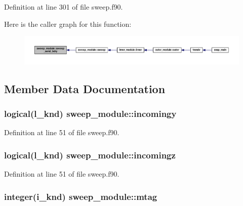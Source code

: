 Definition at line 301 of file sweep.\-f90.



Here is the caller graph for this function\-:\nopagebreak
\begin{figure}[H]
\begin{center}
\leavevmode
\includegraphics[width=350pt]{classsweep__module_a4eb92bcf3c9cd5265030a030fe7c7937_icgraph}
\end{center}
\end{figure}




\subsection{Member Data Documentation}
\hypertarget{classsweep__module_a2169c5c3d0b58d4481c11c192d77139d}{
\subsubsection[{incomingy}]{\setlength{\rightskip}{0pt plus 5cm}logical(l\-\_\-knd) sweep\-\_\-module\-::incomingy\hspace{0.3cm}{\ttfamily [private]}}}\label{classsweep__module_a2169c5c3d0b58d4481c11c192d77139d}


Definition at line 51 of file sweep.\-f90.

\hypertarget{classsweep__module_a0a5733d013646bed24b58e6e63c1f348}{
\subsubsection[{incomingz}]{\setlength{\rightskip}{0pt plus 5cm}logical(l\-\_\-knd) sweep\-\_\-module\-::incomingz\hspace{0.3cm}{\ttfamily [private]}}}\label{classsweep__module_a0a5733d013646bed24b58e6e63c1f348}


Definition at line 51 of file sweep.\-f90.

\hypertarget{classsweep__module_a39fa545755e54cbd311b4fe016cfa439}{
\subsubsection[{mtag}]{\setlength{\rightskip}{0pt plus 5cm}integer(i\-\_\-knd) sweep\-\_\-module\-::mtag\hspace{0.3cm}{\ttfamily [private]}}}\label{classsweep__module_a39fa545755e54cbd311b4fe016cfa439}


